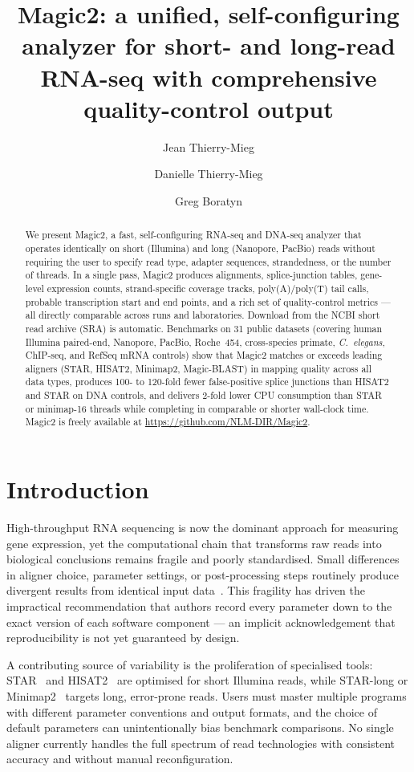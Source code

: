 \documentclass[11pt]{article}
\title{\textbf{Magic2: a unified, self-configuring analyzer for short-
       and long-read RNA-seq with comprehensive quality-control output}}
\author[1]{Jean Thierry-Mieg}
\author[1]{Danielle Thierry-Mieg}
\author[2]{Greg Boratyn}
\affil[1]{Department of Internal Research, National Library
          of Medicine, National Institutes of Health, Bethesda, MD, USA}
\affil[2]{National Center for Biotechnology Information, National Library
          of Medicine, National Institutes of Health, Bethesda, MD, USA}
\date{}
\begin{document}
\maketitle

\begin{abstract}
We present Magic2, a fast, self-configuring RNA-seq and DNA-seq analyzer
that operates identically on short (Illumina) and long (Nanopore,
PacBio) reads without requiring the user to specify read type, adapter
sequences, strandedness, or the number of threads.
In a single pass, Magic2 produces alignments, splice-junction tables,
gene-level expression counts, strand-specific coverage tracks,
poly(A)/poly(T) tail calls, probable transcription start and end points,
and a rich set of quality-control metrics
— all directly comparable across runs and laboratories.
Download from the NCBI short read archive (SRA) is automatic.
Benchmarks on 31 public datasets (covering human Illumina paired-end,
Nanopore, PacBio, Roche~454, cross-species primate, \textit{C.\ elegans},
ChIP-seq, and RefSeq mRNA controls) show that Magic2 matches
or exceeds leading aligners (STAR, HISAT2, Minimap2, Magic-BLAST) in
mapping quality across all data types, produces 100- to
120-fold fewer false-positive splice junctions than HISAT2 and STAR on
DNA controls, and delivers 2-fold lower CPU consumption than STAR
or minimap-16 threads while
completing in comparable or shorter wall-clock time.
Magic2 is freely available at \url{https://github.com/NLM-DIR/Magic2}.
\end{abstract}

\section*{Introduction}

High-throughput RNA sequencing is now the dominant approach for
measuring gene expression, yet the computational chain that transforms
raw reads into biological conclusions remains fragile and poorly
standardised.
Small differences in aligner choice, parameter settings, or
post-processing steps routinely produce divergent results from
identical input data~\citep{maqc2014,seqc2019}.
This fragility has driven the impractical recommendation that authors
record every parameter down to the exact version of each software
component — an implicit acknowledgement that reproducibility is not
yet guaranteed by design.

A contributing source of variability is the proliferation of
specialised tools: STAR~\citep{dobin2013} and
HISAT2~\citep{kim2019} are optimised for short Illumina reads,
while STAR-long or Minimap2~\citep{li2018} targets long, error-prone reads.
Users must master multiple programs with different parameter
conventions and output formats, and the choice of default parameters
can unintentionally bias benchmark comparisons.
No single aligner currently handles the full spectrum of read
technologies with consistent accuracy and without manual
reconfiguration.
\end{document}
